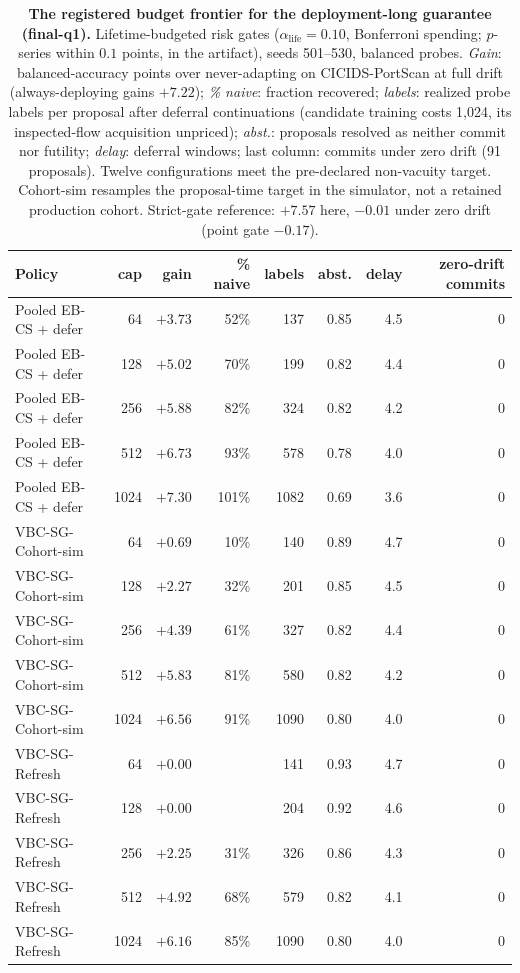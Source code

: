 \begin{table}[t]
\centering
\caption{\textbf{The registered budget frontier for the deployment-long guarantee (final-q1).}
Lifetime-budgeted risk gates ($\alpha_{\mathrm{life}}{=}0.10$, Bonferroni spending;
$p$-series within $0.1$ points, in the artifact), seeds 501--530, balanced probes.
\emph{Gain}: balanced-accuracy points over never-adapting on CICIDS-PortScan at full
drift (always-deploying gains $+7.22$); \emph{\% naive}: fraction recovered;
\emph{labels}: realized probe labels per proposal after deferral continuations (candidate
training costs 1{,}024, its inspected-flow acquisition unpriced); \emph{abst.}:
proposals resolved as neither commit nor futility; \emph{delay}: deferral windows; last
column: commits under zero drift (91 proposals). Twelve configurations meet the pre-declared
non-vacuity target. Cohort-sim resamples the proposal-time target in the simulator, not a
retained production cohort. Strict-gate reference: $+7.57$ here,
$-0.01$ under zero drift (point gate $-0.17$).}
\label{tab:budget_frontier}
\small
\begin{tabular}{l r r r r r r r}
\toprule
Policy & cap & gain & \% naive & labels & abst. & delay & zero-drift commits \\
\midrule
Pooled EB-CS + defer & 64 & $+3.73$ & 52\% & 137 & 0.85 & 4.5 & 0 \\
Pooled EB-CS + defer & 128 & $+5.02$ & 70\% & 199 & 0.82 & 4.4 & 0 \\
Pooled EB-CS + defer & 256 & $+5.88$ & 82\% & 324 & 0.82 & 4.2 & 0 \\
Pooled EB-CS + defer & 512 & $+6.73$ & 93\% & 578 & 0.78 & 4.0 & 0 \\
Pooled EB-CS + defer & 1024 & $+7.30$ & 101\% & 1082 & 0.69 & 3.6 & 0 \\
\addlinespace
VBC-SG-Cohort-sim & 64 & $+0.69$ & 10\% & 140 & 0.89 & 4.7 & 0 \\
VBC-SG-Cohort-sim & 128 & $+2.27$ & 32\% & 201 & 0.85 & 4.5 & 0 \\
VBC-SG-Cohort-sim & 256 & $+4.39$ & 61\% & 327 & 0.82 & 4.4 & 0 \\
VBC-SG-Cohort-sim & 512 & $+5.83$ & 81\% & 580 & 0.82 & 4.2 & 0 \\
VBC-SG-Cohort-sim & 1024 & $+6.56$ & 91\% & 1090 & 0.80 & 4.0 & 0 \\
\addlinespace
VBC-SG-Refresh & 64 & $+0.00$ &  & 141 & 0.93 & 4.7 & 0 \\
VBC-SG-Refresh & 128 & $+0.00$ &  & 204 & 0.92 & 4.6 & 0 \\
VBC-SG-Refresh & 256 & $+2.25$ & 31\% & 326 & 0.86 & 4.3 & 0 \\
VBC-SG-Refresh & 512 & $+4.92$ & 68\% & 579 & 0.82 & 4.1 & 0 \\
VBC-SG-Refresh & 1024 & $+6.16$ & 85\% & 1090 & 0.80 & 4.0 & 0 \\
\bottomrule
\end{tabular}
\end{table}
